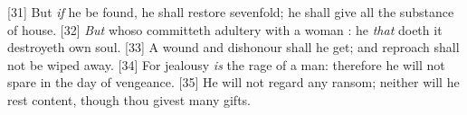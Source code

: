 [31] \textcolor[cmyk]{0.99998,1,0,0}{But \emph{if} he be found, he shall restore sevenfold; he shall give all the substance of  house.}
[32] \textcolor[cmyk]{0.99998,1,0,0}{\emph{But} whoso committeth adultery with a woman : he \emph{that} doeth it destroyeth  own soul.}
[33] \textcolor[cmyk]{0.99998,1,0,0}{A wound and dishonour shall he get; and  reproach shall not be wiped away.}
[34] \textcolor[cmyk]{0.99998,1,0,0}{For jealousy \emph{is} the rage of a man: therefore he will not spare in the day of vengeance.}
[35] \textcolor[cmyk]{0.99998,1,0,0}{He will not regard any ransom; neither will he rest content, though thou givest many gifts.}





